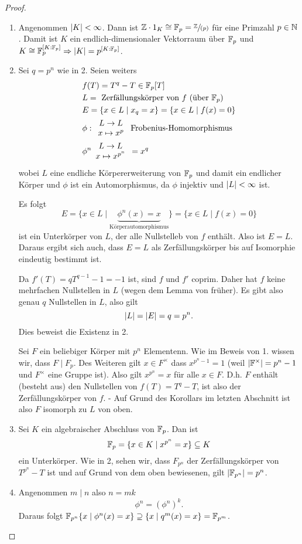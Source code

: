 \begin{proof}
	\begin{enumerate}[1)]
		\item Angenommen $\abs{K} < \infty$. Dann ist $\mathbb{Z} \cdot 1_{K} \cong \mathbb{F}_{p} = \sfrac{\mathbb{Z}}{(p)}$ für eine Primzahl $p \in \mathbb{N}$.
			Damit ist $K$ ein endlich-dimensionaler Vektorraum über $\mathbb{F}_{p}$ und $K \cong  \mathbb{F}_{p}^{[K : \mathbb{F}_{p}]} \Rightarrow  \abs{K} = p^{[K : \mathbb{F}_{p}]}$.
		\item Sei $q = p^{n}$ wie in 2. Seien weiters
			\begin{align*}
				&f(T) = T^{q}- T \in \mathbb{F}_{p}[T]\\
				&L =  \text{ Zerfällungskörper von $f$ (über $\mathbb{F}_p$)}\\
				&E = \{x \in L \mid x_{q} = x\} = \{x \in L \mid f(x) = 0\} \\
				&\phi: \begin{array}{c} L \to L\\ x \mapsto x^{p}\\ \end{array} \text{ Frobenius-Homomorphismus }\\
				&\phi^{n} \begin{array}{c} L \to L\\ x \mapsto x^{p^{n}}\\ \end{array} = x^{q}
			\end{align*}
			wobei $L$ eine endliche Körpererweiterung von $\mathbb{F}_{p}$ und damit ein endlicher Körper und $\phi$ ist ein Automorphismus, da $\phi$ injektiv und $\abs{L} < \infty$ ist.

			Es folgt
			\[
				E = \{x \in L \mid \underbrace{\phi^{n}(x) = x}_{\text{Körperautomorphismus}}\} = \{ x \in L \mid f(x) = 0\} 
			\] 
			ist ein Unterkörper von $L$, der alle Nullstelleb von $f$ enthält. Also ist $E = L$.
			Daraus ergibt sich auch, dass $E = L$ als Zerfällungskörper bis auf Isomorphie eindeutig bestimmt ist.

			Da $f'(T) = q T^{q-1} -1 = -1$ ist, sind $f$ und $f'$ coprim.
			Daher hat $f$ keine mehrfachen Nullstellen in $L$ (wegen dem Lemma von früher).
			Es gibt also genau $q$ Nullstellen in $L$, also gilt 
			\[
			\abs{L} = \abs{E}= q = p^{n}
			.\] 
			Dies beweist die Existenz  in  2.

			Sei $F$ ein beliebiger Körper mit $p^{n}$ Elementenn. Wie im Beweis von 1. wissen wir, dass $F \mid F_{p}$.
			Des Weiteren gilt $x \in F^{\times}$ dass $x^{p^{n}-1} = 1$ (weil $\abs{\mathbb{F}^{\times }} = p^{n}-1$ und $F^{\times}$ eine Gruppe ist).
			Also gilt $x^{p^{n}} = x$ für alle $x \in F$.
			D.h. $F$ enthält (besteht aus) den Nullstellen von $f(T) = T^{q} - T$,
			ist also der Zerfällungskörper von $f$. - Auf Grund des Korollars im letzten Abschnitt ist also $F$ isomorph 
			zu $L$ von oben.
		\item Sei $K$ ein algebraischer Abschluss von $\mathbb{F}_{p}$. Dan ist
			\[
			\mathbb{F}_{p} = \{ x \in K \mid x^{p^{n}} = x\} \subseteq K
			\] 
			ein Unterkörper. Wie in 2, sehen wir, dass $F_{p^{n}}$ der Zerfällungskörper von $T^{p^{n}} - T$ ist und
			auf Grund von dem oben bewiesenen, gilt $\abs{\mathbb{F}_{p^{n}}} = p^{n}$.
		\item Angenommen $m \mid n$ also $n  = m k$ 
			\[
				\phi^{n} = \left( \phi^{n} \right)^{k}
			.\] 
			Daraus folgt $\mathbb{F}_{p^{n}} \{x \mid \phi^{n}(x) = x\} \supseteq \{x \mid q^{m}(x) = x\} = \mathbb{F}_{p^{m}}$.


\end{enumerate}
\end{proof}
